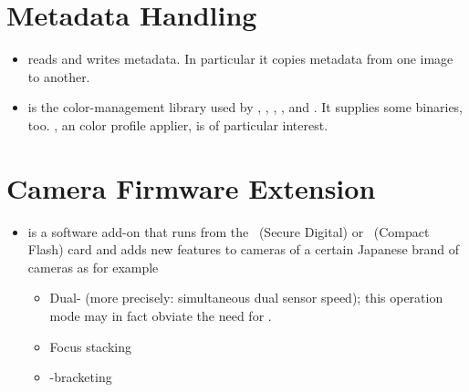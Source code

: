 \section[Metadata Handling]{\label{sec:metadata-handling}%
  Metadata Handling}

\begin{itemize}
  \label{app:exiftool}%
\item
   reads and writes  metadata.  In
  particular it copies metadata from one image to another.

  \label{app:littlecms}%
\item
   is the color-management library used by ,
  , , \App, and \OtherApp.  It supplies some binaries,
  too.  , an  color profile applier, is of particular interest.
\end{itemize}


\section[Camera Firmware Extension]{\label{sec:camera-firmware-extension}%
  Camera Firmware Extension}

\begin{itemize}
  \label{app:magiclantern}%
\item
   is a software add-on that runs from the
  ~(Secure Digital) or ~(Compact Flash) card and adds new features to
  cameras of a certain Japanese brand of cameras as for example

  \begin{itemize}
  \item
    Dual- (more precisely: simultaneous dual sensor speed); this operation mode may
    in fact obviate the need for .

  \item
    Focus stacking

  \item
    -bracketing
  \end{itemize}
\end{itemize}



